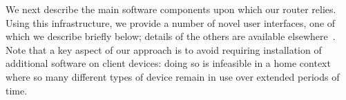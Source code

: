 

                                                                     

  We next describe the main software components upon which our
router relies.  Using this infrastructure, we provide a number of
novel user interfaces, one of which we describe briefly below; details
of the others are available
elsewhere~\cite{mortier11:_suppor_novel_home_networ_manag}.  Note that
a key aspect of our approach is to avoid requiring installation of
additional software on client devices: doing so is infeasible in a
home context where so many different types of device remain in use
over extended periods of time.


